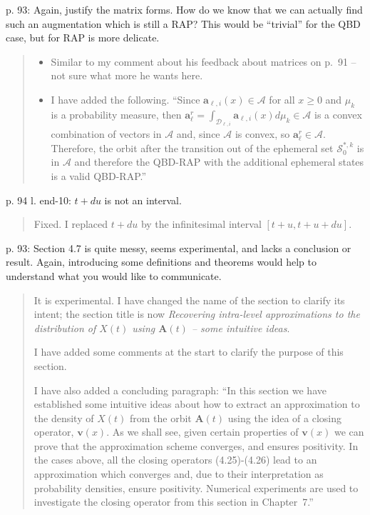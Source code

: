 \documentclass[a4paper]{article}
\begin{document}
p. 93: Again, justify the matrix forms. How do we know that we can actually find such an augmentation which is still a RAP? This would be “trivial” for the QBD case, but for RAP is more delicate.
\begin{quote}
    \begin{itemize}
        \item Similar to my comment about his feedback about matrices on p.~91 -- not sure what more he wants here.
        \item I have added the following. ``Since \(\boldsymbol a_{\ell,i}(x)\in\mathcal A\) for all \(x\geq 0\) and \(\mu_k\) is a probability measure, then \(\boldsymbol a_\ell^r=\int_{\mathcal D_{\ell,i}}\boldsymbol a_{\ell,i}(x)d \mu_k\in \mathcal A\) is a convex combination of vectors in \(\mathcal A\) and, since \(\mathcal A\) is convex, so \(\boldsymbol a_\ell^r\in\mathcal A\). Therefore, the orbit after the transition out of the ephemeral set \(\mathcal S_{0}^{*,k}\) is in \(\mathcal A\) and therefore the QBD-RAP with the additional ephemeral states is a valid QBD-RAP.''
    \end{itemize}
\end{quote}

p. 94 l. end-10: \(t + du\) is not an interval.
\begin{quote}
    Fixed. I replaced \(t+du\) by the infinitesimal interval \([t+u,t+u+du]\). 
\end{quote}

p. 93: Section 4.7 is quite messy, seems experimental, and lacks a conclusion or result. Again, introducing some definitions and theorems would help to understand what you would like to communicate.
\begin{quote}
   It is experimental. I have changed the name of the section to clarify its intent; the section title is now \textit{Recovering intra-level approximations to the distribution of \(X(t)\) using \(\boldsymbol A(t)\) -- some intuitive ideas}.

   I have added some comments at the start to clarify the purpose of this section. 

   I have also added a concluding paragraph: ``In this section we have established some intuitive ideas about how to extract an approximation to the density of \(X(t)\) from the orbit \(\boldsymbol A(t)\) using the idea of a closing operator, \(\boldsymbol v(x)\). As we shall see, given certain properties of \({\boldsymbol v}(x)\) we can prove that the approximation scheme converges, and ensures positivity. In the cases above, all the closing operators (4.25)-(4.26) lead to an approximation which converges and, due to their interpretation as probability densities, ensure positivity. Numerical experiments are used to investigate the closing operator from this section in Chapter~7.''
\end{quote}
\end{document}
